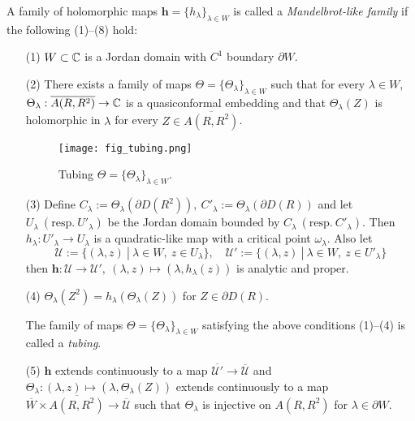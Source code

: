 A family of holomorphic maps $\boldsymbol{h} = \{ h_\lambda \}_{\lambda \in W}$ 
is called a {\it Mandelbrot-like family} if the 
following (1)--(8) hold: 


\begin{itemize}
\setlength{\itemsep}{5pt}
\item[(1)]
$W \subset \mathbb C$ is a Jordan domain with $C^1$ boundary $\partial W$.

\item[(2)]
There exists a family of maps 
$\Theta = \{ \Theta_\lambda \}_{\lambda \in W}$ such that
for every $\lambda \in W$, $\Theta_\lambda : \overline{A(R, R^2)} \to \mathbb C$ is a 
quasiconformal embedding and that $\Theta_\lambda(Z)$ is holomorphic in 
$\lambda$ for every $Z \in \overline{A(R, R^2)}$.


\begin{figure}[htbp]
\hskip 1cm
\texttt{[image: fig\_tubing.png]}
\caption{\small Tubing 
$\Theta = \{ \Theta_\lambda \}_{\lambda \in W}$.}
\end{figure}


\item[(3)]
Define $C_\lambda := \Theta_\lambda(\partial D(R^2)), \
C'_\lambda := \Theta_\lambda(\partial D(R))$
and let 
$U_\lambda \ (\text{resp.} \ U'_\lambda)$ be the Jordan domain bounded by 
$C_\lambda \ (\text{resp.} \ C'_\lambda)$. Then
$h_\lambda : U'_\lambda \to U_\lambda$ is a quadratic-like map with
a critical point $\omega_\lambda$. Also let
$$
  {\mathcal U} := \{ (\lambda, z) \ | \ \lambda \in W, \ z \in U_\lambda \}, \quad
  {\mathcal U'} := \{ (\lambda, z) \ | \ \lambda \in W, \ z \in U'_\lambda \}
$$
then
$\boldsymbol{h} : {\mathcal U} \to {\mathcal U'}, \ 
(\lambda, z) \mapsto (\lambda, h_\lambda(z))$ is analytic and proper.


\item[(4)]
$\Theta_\lambda(Z^2) = h_\lambda(\Theta_\lambda(Z))$ for $Z \in \partial D(R)$.


\vskip 2mm

\noin
The family of maps 
$\Theta = \{ \Theta_\lambda \}_{\lambda \in W}$ satisfying the above conditions
(1)--(4) is called a {\it tubing}. 

\vskip 2mm


\item[(5)]
$\boldsymbol{h}$ extends continuously to a map 
$\overline{{\mathcal U}'} \to \overline{\mathcal U}$ and 
$\Theta_\lambda : (\lambda ,z) \mapsto (\lambda, \Theta_\lambda(Z))$ extends 
continuously to a map 
$\overline{W} \times \overline{A(R, R^2)} \to \overline{\mathcal U}$
such that $\Theta_\lambda$ is injective on $A(R, R^2)$ for $\lambda \in \partial W$.



\end{itemize}
